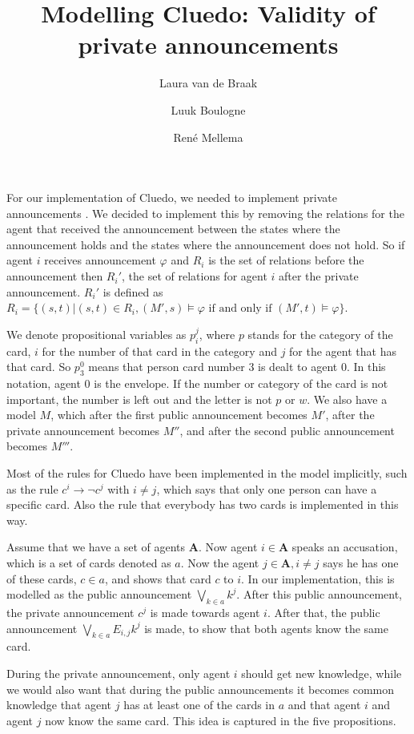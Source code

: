 \documentclass[a4paper, 10pt]{article}
\title{Modelling Cluedo: Validity of private announcements}
\author{Laura van de Braak \and Luuk Boulogne \and Ren\'e Mellema}
\date{}
\newcommand{\impl}{\rightarrow}
\newcommand{\A}{\mathbf{A}}
\begin{document}
\maketitle

For our implementation of Cluedo, we needed to implement private
announcements \citep[see][Chapter 6]{ditmarsch2007dynamic}. We decided to
implement this by removing the relations for the agent that received the
announcement between the states where the announcement holds and the states
where the announcement does not hold. So if agent $i$ receives announcement
$\varphi$ and $R_i$ is the set of relations before the announcement then
$R_i'$, the set of relations for agent $i$ after the private announcement.
$R_i'$ is defined as $R_i = \{(s, t) | (s, t) \in R_i, (M', s) \models
\varphi \text{ if and only if } (M', t) \models \varphi\}$.

We denote propositional variables as $p_i^j$, where $p$ stands for the
category of the card, $i$ for the number of that card in the category and
$j$ for the agent that has that card. So $p_3^0$ means that person card
number 3 is dealt to agent 0. In this notation, agent 0 is the envelope.
If the number or category of the card is not important, the number is left
out and the letter is not $p$ or $w$.  We also have a model $M$, which
after the first public announcement becomes $M'$, after the private
announcement becomes $M''$, and after the second public announcement becomes
$M'''$.

Most of the rules for Cluedo have been implemented in the model implicitly,
such as the rule $c^i \impl \neg c^j$ with $i \not = j$, which says that only
one person can have a specific card. Also the rule that everybody has two
cards is implemented in this way.

Assume that we have a set of agents $\A$. Now agent $i \in \A$ speaks an
accusation, which is a set of cards denoted as $a$. Now the agent $j \in
\A, i \not = j$ says he has one of these cards, $c \in a$, and shows that
card $c$ to $i$.  In our implementation, this is modelled as the public
announcement $\bigvee_{k \in a} k^j$. After this public announcement, the
private announcement $c^j$ is made towards agent $i$. After that, the
public announcement $\bigvee_{k \in a} E_{i, j} k^j$ is made, to show that
both agents know the same card. 

During the private announcement, only agent $i$ should get new knowledge,
while we would also want that during the public announcements it becomes
common knowledge that agent $j$ has at least one of the cards in $a$ and
that agent $i$ and agent $j$ now know the same card. This idea is captured
in the five propositions.
\end{document}
